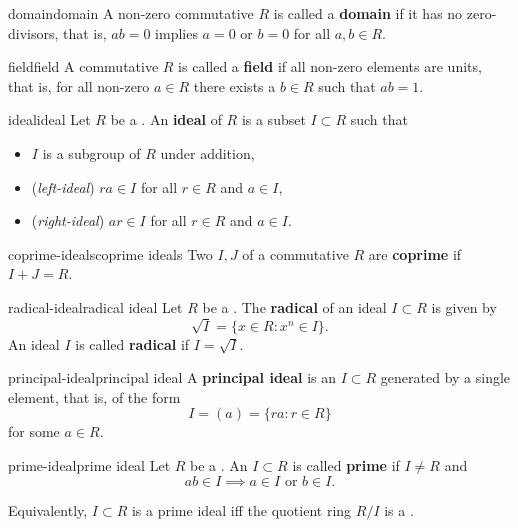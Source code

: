 \begin{topic}{domain}{domain}
    A non-zero commutative  $R$ is called a \textbf{domain} if it has no zero-divisors, that is, $ab = 0$ implies $a = 0$ or $b = 0$ for all $a, b \in R$.
\end{topic}

\begin{topic}{field}{field}
    A commutative  $R$ is called a \textbf{field} if all non-zero elements are units, that is, for all non-zero $a \in R$ there exists a $b \in R$ such that $ab = 1$. 
\end{topic}

\begin{topic}{ideal}{ideal}
    Let $R$ be a . An \textbf{ideal} of $R$ is a subset $I \subset R$ such that
    \begin{itemize}
        \item $I$ is a subgroup of $R$ under addition,
        \item (\textit{left-ideal}) $ra \in I$  for all $r \in R$ and $a \in I$,
        \item (\textit{right-ideal}) $ar \in I$ for all $r \in R$ and $a \in I$.
    \end{itemize}
\end{topic}

\begin{topic}{coprime-ideals}{coprime ideals}
    Two  $I, J$ of a commutative  $R$ are \textbf{coprime} if $I + J = R$.
\end{topic}

\begin{topic}{radical-ideal}{radical ideal}
    Let $R$ be a . The \textbf{radical} of an ideal $I \subset R$ is given by
    \[ \sqrt{I} = \{ x \in R : x^n \in I \} . \]
    An ideal $I$ is called \textbf{radical} if $I = \sqrt{I}$.
\end{topic}

\begin{topic}{principal-ideal}{principal ideal}
    A \textbf{principal ideal} is an  $I \subset R$ generated by a single element, that is, of the form
    \[ I = (a) = \{ r a : r \in R \} \]
    for some $a \in R$.
\end{topic}

\begin{topic}{prime-ideal}{prime ideal}
    Let $R$ be a . An  $I \subset R$ is called \textbf{prime} if $I \ne R$ and
    \[ ab \in I \implies a \in I \text{ or } b \in I . \]
    
    Equivalently, $I \subset R$ is a prime ideal iff the quotient ring $R / I$ is a .
\end{topic}

